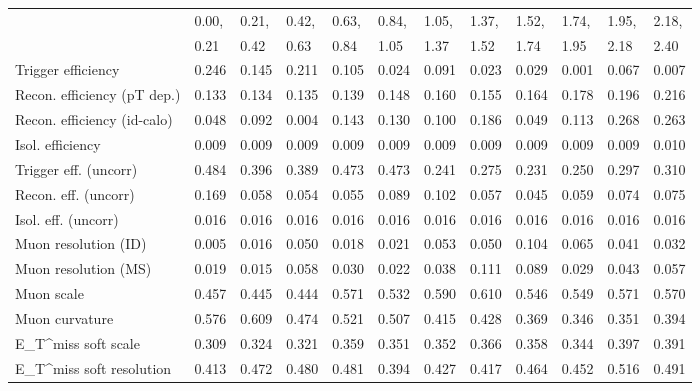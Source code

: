 \begin{tabular}{l|p{0.6cm}p{0.6cm}p{0.6cm}p{0.6cm}p{0.6cm}p{0.6cm}p{0.6cm}p{0.6cm}p{0.6cm}p{0.6cm}p{0.6cm}}
\hline
   & 0.00, & 0.21, & 0.42, & 0.63, & 0.84, & 1.05, & 1.37, & 1.52, & 1.74, & 1.95, & 2.18,  \\ 
   & 0.21 & 0.42 & 0.63 & 0.84 & 1.05 & 1.37 & 1.52 & 1.74 & 1.95 & 2.18 & 2.40  \\ 
\hline
Trigger efficiency                       & 0.246 & 0.145 & 0.211 & 0.105 & 0.024 & 0.091 & 0.023 & 0.029 & 0.001 & 0.067 & 0.007 \\
Recon. efficiency (pT dep.)              & 0.133 & 0.134 & 0.135 & 0.139 & 0.148 & 0.160 & 0.155 & 0.164 & 0.178 & 0.196 & 0.216 \\
Recon. efficiency (id-calo)              & 0.048 & 0.092 & 0.004 & 0.143 & 0.130 & 0.100 & 0.186 & 0.049 & 0.113 & 0.268 & 0.263 \\
Isol. efficiency                         & 0.009 & 0.009 & 0.009 & 0.009 & 0.009 & 0.009 & 0.009 & 0.009 & 0.009 & 0.009 & 0.010 \\
Trigger eff. (uncorr)                    & 0.484 & 0.396 & 0.389 & 0.473 & 0.473 & 0.241 & 0.275 & 0.231 & 0.250 & 0.297 & 0.310 \\
Recon. eff. (uncorr)                     & 0.169 & 0.058 & 0.054 & 0.055 & 0.089 & 0.102 & 0.057 & 0.045 & 0.059 & 0.074 & 0.075 \\
Isol. eff. (uncorr)                      & 0.016 & 0.016 & 0.016 & 0.016 & 0.016 & 0.016 & 0.016 & 0.016 & 0.016 & 0.016 & 0.016 \\
Muon resolution (ID)                     & 0.005 & 0.016 & 0.050 & 0.018 & 0.021 & 0.053 & 0.050 & 0.104 & 0.065 & 0.041 & 0.032 \\
Muon resolution (MS)                     & 0.019 & 0.015 & 0.058 & 0.030 & 0.022 & 0.038 & 0.111 & 0.089 & 0.029 & 0.043 & 0.057 \\
Muon scale                               & 0.457 & 0.445 & 0.444 & 0.571 & 0.532 & 0.590 & 0.610 & 0.546 & 0.549 & 0.571 & 0.570 \\
Muon curvature                           & 0.576 & 0.609 & 0.474 & 0.521 & 0.507 & 0.415 & 0.428 & 0.369 & 0.346 & 0.351 & 0.394 \\
E_{T}^{miss} soft scale                  & 0.309 & 0.324 & 0.321 & 0.359 & 0.351 & 0.352 & 0.366 & 0.358 & 0.344 & 0.397 & 0.391 \\
E_{T}^{miss} soft resolution             & 0.413 & 0.472 & 0.480 & 0.481 & 0.394 & 0.427 & 0.417 & 0.464 & 0.452 & 0.516 & 0.491 \\

\end{tabular}
